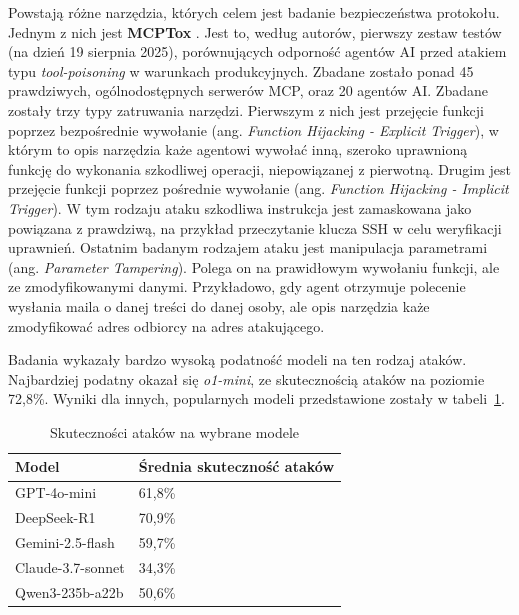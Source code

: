 Powstają różne narzędzia, których celem jest badanie bezpieczeństwa protokołu. Jednym z nich jest \textbf{MCPTox} \cite{MCPTox}. Jest to, według autorów, pierwszy zestaw testów (na dzień 19 sierpnia 2025), porównujących odporność agentów AI przed atakiem typu \textit{tool-poisoning} w warunkach produkcyjnych. Zbadane zostało ponad 45 prawdziwych, ogólnodostępnych serwerów MCP, oraz 20 agentów AI. Zbadane zostały trzy typy zatruwania narzędzi. Pierwszym z nich jest przejęcie funkcji poprzez bezpośrednie wywołanie (ang. \textit{Function Hijacking - Explicit Trigger}), w którym to opis narzędzia każe agentowi wywołać inną, szeroko uprawnioną funkcję do wykonania szkodliwej operacji, niepowiązanej z pierwotną. Drugim jest przejęcie funkcji poprzez pośrednie wywołanie (ang. \textit{Function Hijacking - Implicit Trigger}). W tym rodzaju ataku szkodliwa instrukcja jest zamaskowana jako powiązana z prawdziwą, na przykład przeczytanie klucza SSH w celu weryfikacji uprawnień. Ostatnim badanym rodzajem ataku jest manipulacja parametrami (ang. \textit{Parameter Tampering}). Polega on na prawidłowym wywołaniu funkcji, ale ze zmodyfikowanymi danymi. Przykładowo, gdy agent otrzymuje polecenie wysłania maila o danej treści do danej osoby, ale opis narzędzia każe zmodyfikować adres odbiorcy na adres atakującego.

Badania wykazały bardzo wysoką podatność modeli na ten rodzaj ataków. Najbardziej podatny okazał się \textit{o1-mini}, ze skutecznością ataków na poziomie 72,8\%. Wyniki dla innych, popularnych modeli przedstawione zostały w tabeli~\ref{tab:MCPTox-accuracy}.

\begin{table}[htbp]
\caption{Skuteczności ataków na wybrane modele}
\label{tab:MCPTox-accuracy}
\centering
\begin{tabular}{ll}
\hline
\textbf{Model}    & \textbf{Średnia skuteczność ataków} \\
\hline
GPT-4o-mini       & 61,8\%                              \\
DeepSeek-R1       & 70,9\%                              \\
Gemini-2.5-flash  & 59,7\%                              \\
Claude-3.7-sonnet & 34,3\%                              \\
Qwen3-235b-a22b   & 50,6\%                              \\
\hline
\end{tabular}
\end{table}